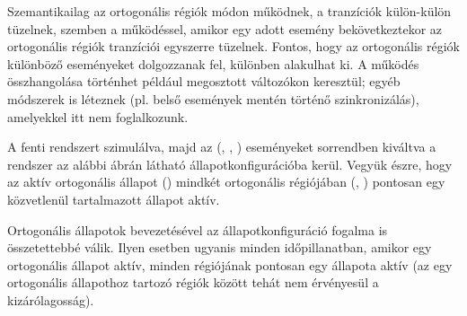 Szemantikailag az ortogonális régiók  módon működnek, a tranzíciók külön-külön tüzelnek, szemben a  működéssel, amikor egy adott esemény bekövetkeztekor az ortogonális régiók tranzíciói egyszerre tüzelnek. Fontos, hogy az ortogonális régiók különböző eseményeket dolgozzanak fel, különben  alakulhat ki. A működés összhangolása történhet például megosztott változókon keresztül; egyéb módszerek is léteznek (pl. belső események mentén történő szinkronizálás), amelyekkel itt nem foglalkozunk. 

\begin{megjegyzes}
	A fenti rendszert szimulálva, majd az (, , ) eseményeket sorrendben kiváltva a rendszer az alábbi ábrán látható állapotkonfigurációba kerül. Vegyük észre, hogy az aktív ortogonális állapot () mindkét ortogonális régiójában (, ) pontosan egy közvetlenül tartalmazott állapot aktív.
	
\end{megjegyzes}

Ortogonális állapotok bevezetésével az állapotkonfiguráció fogalma is összetettebbé válik. Ilyen esetben ugyanis minden időpillanatban, amikor egy ortogonális állapot aktív, minden régiójának pontosan egy állapota aktív (az egy ortogonális állapothoz tartozó régiók között tehát nem érvényesül a kizárólagosság).

